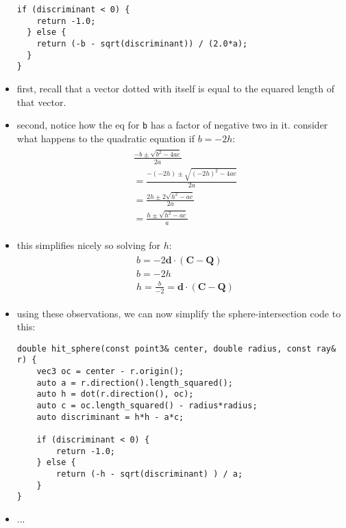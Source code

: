 \begin{itemize}
\begin{lstlisting}[style=rosepinestyle]
  if (discriminant < 0) {
    return -1.0;
  } else {
    return (-b - sqrt(discriminant)) / (2.0*a);
  }
}
\end{lstlisting}
    \item first, recall that a vector dotted with itself is equal to the equared
        length of that vector. 
    \item second, notice how the eq for \texttt{b} has a factor of negative two
        in it. consider what happens to the quadratic equation if $b = -2h:$
        \begin{align*}
            &\begin{array}{c}
                \displaystyle \frac{-b\pm \sqrt{b^{2}-4ac}}{2a} \\[15pt]
                \displaystyle = \frac{-(-2h) \pm \sqrt{(-2h)^{2}-4ac}}{2a} \\[15pt]
                \displaystyle = \frac{2h \pm 2\sqrt{h^{2}-ac}}{2a} \\[15pt]
                \displaystyle = \frac{h \pm \sqrt{h^{2}-ac}}{a} 
            \end{array}
        \end{align*}
    \item this simplifies nicely so solving for $h$:
        \begin{align*}
            &\begin{array}{c}
                \displaystyle b = -2\mathbf{d}\cdot (\mathbf{C}-\mathbf{Q}) \\[15pt] 
                \displaystyle b = -2h \\[15pt] 
                \displaystyle h = \frac{b}{-2} = \mathbf{d}\cdot (\mathbf{C}-\mathbf{Q})
            \end{array}
        \end{align*}
    \item using these observations, we can now simplify the sphere-intersection
        code to this: 
\begin{lstlisting}[style=rosepinestyle]
double hit_sphere(const point3& center, double radius, const ray& r) {
    vec3 oc = center - r.origin();
    auto a = r.direction().length_squared(); 
    auto h = dot(r.direction(), oc);
    auto c = oc.length_squared() - radius*radius;
    auto discriminant = h*h - a*c;

    if (discriminant < 0) {
        return -1.0;
    } else {
        return (-h - sqrt(discriminant) ) / a;
    }
}
\end{lstlisting}
    \item ...
\end{itemize}
